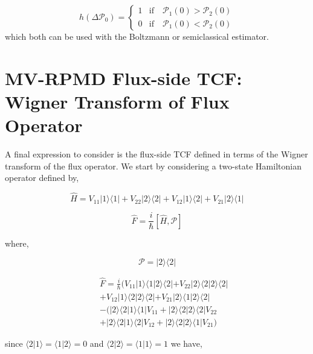 \documentclass[phd,tocprelim]{cornell}
\begin{document}
\begin{equation}
   h( \Delta \mathcal{P}_0)=\left\{
     \begin{array}{ll}
     1 & \textrm{if} \quad \mathcal{P}_1(0)>\mathcal{P}_2(0)\\
     0 &  \textrm{if} \quad  \mathcal{P}_1(0)<\mathcal{P}_2(0)
    \end{array}\right.
    \label{eq:hs}
\end{equation}
which both can be used with the Boltzmann or semiclassical estimator. 

\section{MV-RPMD Flux-side TCF: Wigner Transform of Flux Operator}
A final expression to consider is the flux-side TCF defined in terms of the Wigner transform of the flux operator. 
We start by considering a two-state Hamiltonian operator defined by, 

\begin{equation}
\hat{H}=V_{11} |1\rangle \langle 1| +V_{22} |2\rangle \langle 2|+V_{12} |1\rangle \langle 2|+V_{21} |2\rangle \langle 1|
\end{equation}

\begin{equation}
\hat{F} = \frac{i}{\hbar} [\hat{H}, \mathcal{P}]
\end{equation}

where,

\begin{equation}
 \mathcal{P}=  |2\rangle \langle 2|
\end{equation}


\begin{eqnarray}
&&\hat{F} = \frac{i}{\hbar} (V_{11} |1\rangle \langle 1|2\rangle \langle 2|+V_{22}|2\rangle \langle 2|2\rangle \langle 2|
\\
\nonumber
&&+
V_{12}|1\rangle \langle 2|2\rangle \langle 2|+V_{21}|2\rangle \langle 1|2\rangle \langle 2|
\\
\nonumber
&&- 
(|2\rangle \langle 2|1\rangle \langle 1|V_{11}+|2\rangle \langle 2|2\rangle \langle 2|V_{22}
\\
\nonumber
&&+
|2\rangle \langle 2|1\rangle \langle 2|V_{12}+|2\rangle \langle 2|2\rangle \langle 1|V_{21})
\end{eqnarray}


since $ \langle 2|1\rangle= \langle1 |2\rangle=0$ and $ \langle 2|2\rangle= \langle1 |1\rangle=1$ we have, 
\end{document}

